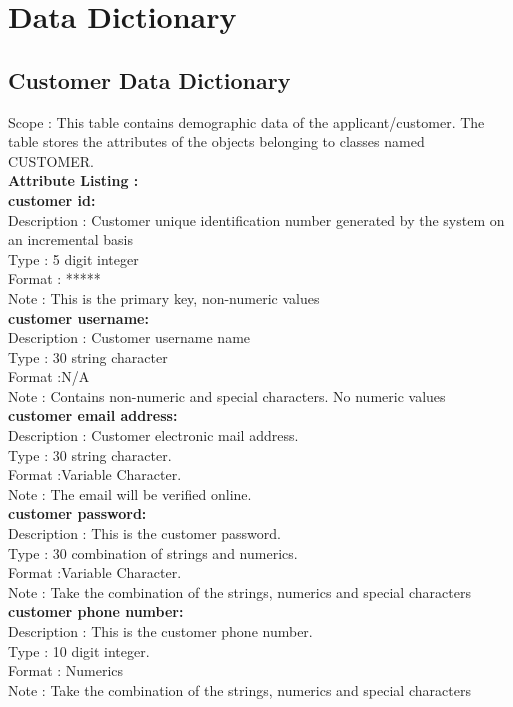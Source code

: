 \documentclass[11pt]{article}
\begin{document}
\section{\Large Data Dictionary} 
\subsection{\Large Customer Data Dictionary} 
Scope : This table contains demographic data of the applicant/customer. The table stores the attributes of the objects belonging to classes named CUSTOMER.\\
\textbf{\Large Attribute Listing : }\\
 
\textbf {customer id:}\\
Description :  Customer unique identification number generated by the system on an incremental basis\\
Type : 5 digit integer \\
Format : ***** \\
Note : This is the primary key, non-numeric values\\

\textbf {customer username:}\\
Description :  Customer username name\\
Type : 30 string character \\
Format :N/A \\
Note : Contains non-numeric and special characters. No numeric values\\

\textbf {customer email address:}\\
Description : Customer electronic mail address.\\
Type : 30 string character. \\
Format :Variable Character. \\
Note : The email will be verified online.\\

\textbf {customer password:}\\
Description : This is the customer password.\\
Type : 30 combination of strings and numerics. \\
Format :Variable Character. \\
Note : Take the combination of the strings, numerics and special characters\\

\textbf {customer phone number:}\\
Description : This is the customer phone number.\\
Type :  10 digit integer. \\
Format : Numerics\\
Note : Take the combination of the strings, numerics and special characters
\end{document}
